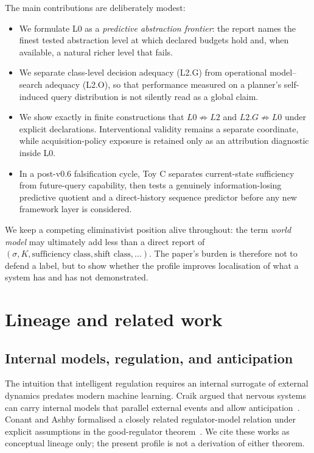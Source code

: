\documentclass[10pt]{article}
\begin{document}
The main contributions are deliberately modest:
\begin{itemize}
    \item We formulate L0 as a \emph{predictive abstraction frontier}: the report names the finest tested abstraction level at which declared budgets hold and, when available, a natural richer level that fails.
    \item We separate class-level decision adequacy (L2.G) from operational model--search adequacy (L2.O), so that performance measured on a planner's self-induced query distribution is not silently read as a global claim.
    \item We show exactly in finite constructions that $L0\not\Rightarrow L2$ and $L2.G\not\Rightarrow L0$ under explicit declarations. Interventional validity remains a separate coordinate, while acquisition-policy exposure is retained only as an attribution diagnostic inside L0.
    \item In a post-v0.6 falsification cycle, Toy C separates current-state sufficiency from future-query capability, then tests a genuinely information-losing predictive quotient and a direct-history sequence predictor before any new framework layer is considered.
\end{itemize}

We keep a competing eliminativist position alive throughout: the term \emph{world model} may ultimately add less than a direct report of $(\sigma,K,\text{sufficiency class},\text{shift class},\ldots)$. The paper's burden is therefore not to defend a label, but to show whether the profile improves localisation of what a system has and has not demonstrated.

\section{Lineage and related work}

\subsection{Internal models, regulation, and anticipation}

The intuition that intelligent regulation requires an internal surrogate of external dynamics predates modern machine learning. Craik argued that nervous systems can carry internal models that parallel external events and allow anticipation~\cite{craik1943}. Conant and Ashby formalised a closely related regulator-model relation under explicit assumptions in the good-regulator theorem~\cite{conant1970}. We cite these works as conceptual lineage only; the present profile is not a derivation of either theorem.
\end{document}
